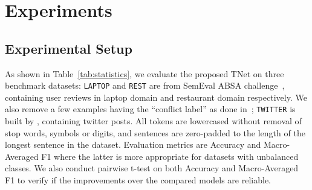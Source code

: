 \documentclass[11pt,a4paper]{article}
\begin{document}
\section{Experiments}
\subsection{Experimental Setup}
As shown in Table~\ref{tab:statistics}, we evaluate the proposed TNet on three benchmark datasets: \texttt{LAPTOP} and \texttt{REST} are from SemEval ABSA challenge~\cite{pontiki-EtAl:2014:SemEval}, containing user reviews in laptop domain and restaurant domain respectively. We also remove a few examples having the ``conflict label'' as done in~\cite{chen-EtAl:2017:EMNLP20171}; \texttt{TWITTER} is built by \citet{dong-EtAl:2014:P14-2}, containing twitter posts. All tokens are lowercased without removal of stop words, symbols or digits, and sentences are zero-padded to the length of the longest sentence in the dataset. Evaluation metrics are Accuracy and Macro-Averaged F1 where the latter is more appropriate for datasets with unbalanced classes. We also conduct pairwise t-test on both Accuracy and Macro-Averaged F1 to verify if the improvements over the compared models are reliable.
\end{document}
